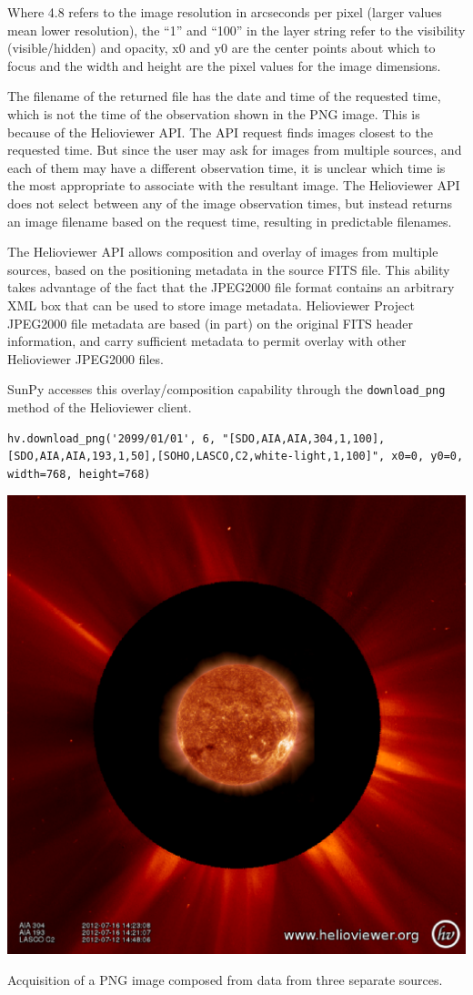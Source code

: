 Where 4.8 refers to the image resolution in arcseconds per pixel
(larger values mean lower resolution), the “1” and “100” in the layer
string refer to the visibility (visible/hidden) and opacity, x0 and y0
are the center points about which to focus and the width and height
are the pixel values for the image dimensions.


The filename of the returned file has the date and time of the
requested time, which is not the time of the observation shown in the
PNG image.  This is because of the Helioviewer API.  The API request
finds images closest to the requested time. But since the user may ask
for images from multiple sources, and each of them may have a
different observation time, it is unclear which time is the most
appropriate to associate with the resultant image.  The Helioviewer
API does not select between any of the image observation times, but
instead returns an image filename based on the request time, resulting
in predictable filenames.

The Helioviewer API allows composition and overlay of images from
multiple sources, based on the positioning metadata in the source FITS
file. This ability takes advantage of the fact that the JPEG2000 file
format contains an arbitrary XML box that can be used to store image
metadata.  Helioviewer Project JPEG2000 file metadata are based (in
part) on the original FITS header information, and carry sufficient
metadata to permit overlay with other Helioviewer JPEG2000 files.

SunPy accesses this overlay/composition capability through the
\texttt{download_png} method of the Helioviewer client.

\begin{listing}
\begin{verbatim}
hv.download_png('2099/01/01', 6, "[SDO,AIA,AIA,304,1,100],[SDO,AIA,AIA,193,1,50],[SOHO,LASCO,C2,white-light,1,100]", x0=0, y0=0, width=768, height=768)
\end{verbatim}
\includegraphics[width=0.8\columnwidth]{helioviewer_overlay_example.eps}
\caption{Acquisition of a PNG image composed from data from three
  separate sources.}
\label{code:downloadjp2}
\end{listing}

